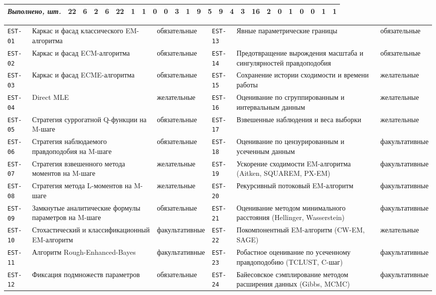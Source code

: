 \documentclass[10pt,a4paper]{article}
\begin{document}
\begin{landscape}
{\begin{longtable}{@{}l *{24}{c}@{}}
\midrule \textit{Выполнено, шт.} & 22 & 6 & 2 & 6 & 22 & 1 & 1 & 0 & 0 & 3 & 1 & 9 & 5 & 9 & 4 & 3 & 16 & 2 & 0 & 1 & 0 & 0 & 1 & 1 \\
\bottomrule
\end{longtable}}
{\scriptsize\setlength{\tabcolsep}{3pt}
\begin{tabular}{@{}l >{\raggedright\arraybackslash}p{7.4cm} l l >{\raggedright\arraybackslash}p{7.4cm} l@{}}
\texttt{EST-01} & Каркас и фасад классического EM-алгоритма & обязательные & \texttt{EST-13} & Явные параметрические границы & обязательные \\
\texttt{EST-02} & Каркас и фасад ECM-алгоритма & обязательные & \texttt{EST-14} & Предотвращение вырождения масштаба и сингулярностей правдоподобия & обязательные \\
\texttt{EST-03} & Каркас и фасад ECME-алгоритма & обязательные & \texttt{EST-15} & Сохранение истории сходимости и времени работы & желательные \\
\texttt{EST-04} & Direct MLE & желательные & \texttt{EST-16} & Оценивание по сгруппированным и интервальным данным & желательные \\
\texttt{EST-05} & Стратегия суррогатной Q-функции на M-шаге & обязательные & \texttt{EST-17} & Взвешенные наблюдения и веса выборки & желательные \\
\texttt{EST-06} & Стратегия наблюдаемого правдоподобия на M-шаге & обязательные & \texttt{EST-18} & Оценивание по цензурированным и усеченным данным & факультативные \\
\texttt{EST-07} & Стратегия взвешенного метода моментов на M-шаге & желательные & \texttt{EST-19} & Ускорение сходимости EM-алгоритма (Aitken, SQUAREM, PX-EM) & факультативные \\
\texttt{EST-08} & Стратегия метода L-моментов на M-шаге & желательные & \texttt{EST-20} & Рекурсивный потоковый EM-алгоритм & факультативные \\
\texttt{EST-09} & Замкнутые аналитические формулы параметров на M-шаге & обязательные & \texttt{EST-21} & Оценивание методом минимального расстояния (Hellinger, Wasserstein) & факультативные \\
\texttt{EST-10} & Стохастический и классификационный EM-алгоритм & факультативные & \texttt{EST-22} & Покомпонентный EM-алгоритм (CW-EM, SAGE) & желательные \\
\texttt{EST-11} & Алгоритм Rough-Enhanced-Bayes & факультативные & \texttt{EST-23} & Робастное оценивание по усеченному правдоподобию (TCLUST, C-шаг) & факультативные \\
\texttt{EST-12} & Фиксация подмножеств параметров & обязательные & \texttt{EST-24} & Байесовское сэмплирование методом расширения данных (Gibbs, MCMC) & факультативные \\
\end{tabular}}


\end{landscape}
\end{document}

